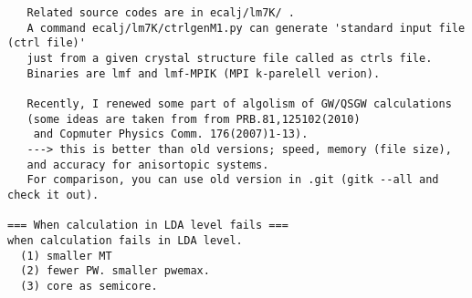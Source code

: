 \documentclass[a4paper,10pt,epsf,fleqn]{article}
\begin{document}
\begin{verbatim}
   Related source codes are in ecalj/lm7K/ .
   A command ecalj/lm7K/ctrlgenM1.py can generate 'standard input file (ctrl file)' 
   just from a given crystal structure file called as ctrls file. 
   Binaries are lmf and lmf-MPIK (MPI k-parelell verion).

   Recently, I renewed some part of algolism of GW/QSGW calculations
   (some ideas are taken from from PRB.81,125102(2010) 
    and Copmuter Physics Comm. 176(2007)1-13).
   ---> this is better than old versions; speed, memory (file size),
   and accuracy for anisortopic systems.
   For comparison, you can use old version in .git (gitk --all and check it out).

=== When calculation in LDA level fails ===
when calculation fails in LDA level.
  (1) smaller MT
  (2) fewer PW. smaller pwemax.
  (3) core as semicore.

\end{verbatim}
\end{document}
